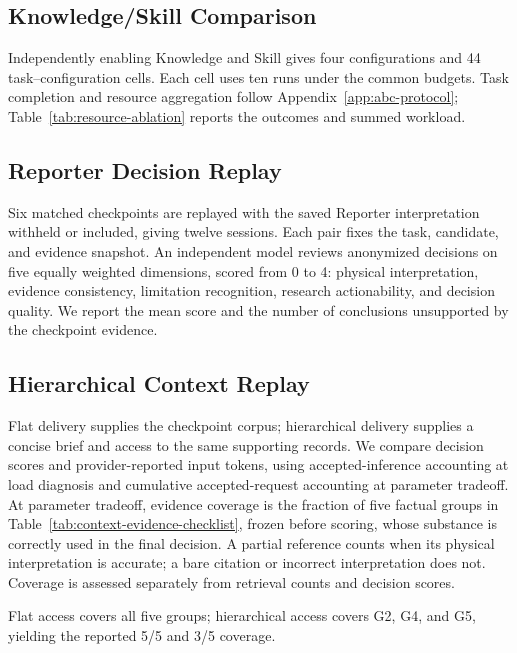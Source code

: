 \subsection{Knowledge/Skill Comparison}
Independently enabling Knowledge and Skill gives four configurations and 44 task--configuration cells. Each cell uses ten runs under the common budgets. Task completion and resource aggregation follow Appendix~\ref{app:abc-protocol}; Table~\ref{tab:resource-ablation} reports the outcomes and summed workload.

\subsection{Reporter Decision Replay}
Six matched checkpoints are replayed with the saved Reporter interpretation withheld or included, giving twelve sessions. Each pair fixes the task, candidate, and evidence snapshot. An independent model reviews anonymized decisions on five equally weighted dimensions, scored from 0 to 4: physical interpretation, evidence consistency, limitation recognition, research actionability, and decision quality. We report the mean score and the number of conclusions unsupported by the checkpoint evidence.

\subsection{Hierarchical Context Replay}
Flat delivery supplies the checkpoint corpus; hierarchical delivery supplies a concise brief and access to the same supporting records. We compare decision scores and provider-reported input tokens, using accepted-inference accounting at load diagnosis and cumulative accepted-request accounting at parameter tradeoff. At parameter tradeoff, evidence coverage is the fraction of five factual groups in Table~\ref{tab:context-evidence-checklist}, frozen before scoring, whose substance is correctly used in the final decision. A partial reference counts when its physical interpretation is accurate; a bare citation or incorrect interpretation does not. Coverage is assessed separately from retrieval counts and decision scores.


Flat access covers all five groups; hierarchical access covers G2, G4, and G5, yielding the reported 5/5 and 3/5 coverage.
